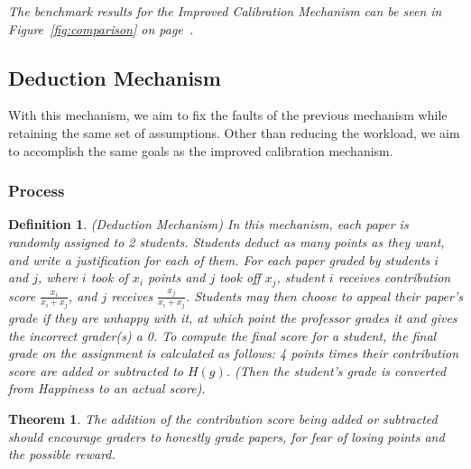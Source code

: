 \documentclass[12pt, Arial]{article}
\newtheorem{theorem}{Theorem}
\newtheorem{definition}{Definition}
\begin{document}
\emph{The benchmark results for the Improved Calibration Mechanism can be seen in Figure~\ref{fig:comparison} on page~\pageref{fig:comparison}.}
\subsection{Deduction Mechanism}
\label{sec:deduction}
With this mechanism, we aim to fix the faults of the previous mechanism while retaining the same set of assumptions. Other than reducing the workload, we aim to accomplish the same goals as the improved calibration mechanism.
\subsubsection{Process}
\begin{definition}(Deduction Mechanism)
In this mechanism, each paper is randomly assigned to 2 students. Students deduct as many points as they want, and write a justification for each of them. For each paper graded by students $i$ and $j$, where $i$ took of $x_i$ points and $j$ took off $x_j$, student $i$ receives contribution score $\frac{x_i}{x_i + x_j}$, and $j$ receives $\frac{x_j}{x_i + x_j}$. Students may then choose to appeal their paper's grade if they are unhappy with it, at which point the professor grades it and gives the incorrect grader(s) a 0. To compute the final score for a student, the final grade on the assignment is calculated as follows: 4 points times their contribution score are added or subtracted to $H(g)$. (Then the student's grade is converted from Happiness to an actual score).
\end{definition}
\begin{theorem}
The addition of the contribution score being added or subtracted should encourage graders to honestly grade papers, for fear of losing points and the possible reward.
\end{theorem}
\end{document}
